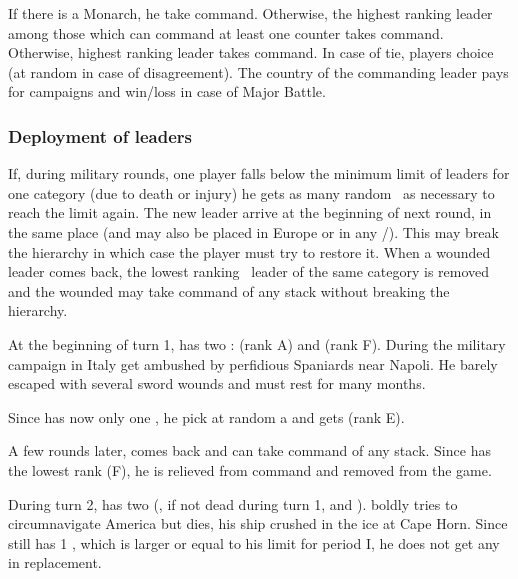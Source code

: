 \aparag[At sea]
\bparag If there is a Monarch, he take command.
\bparag Otherwise, the highest ranking leader among those which can command at
least one \FLEET counter takes command.
\bparag Otherwise, highest ranking leader takes command.
\bparag In case of tie, players choice (at random in case of disagreement).
\bparag The country of the commanding leader pays for campaigns and win/loss
\STAB in case of Major Battle.

\subsubsection{Deployment of leaders}
\label{chMilitary:Leaders:Below limit}
\bparag If, during military rounds, one player falls below the minimum limit
of leaders for one category (due to death or injury) he gets as many random
\anonyme\ as necessary to reach the limit again.
\bparag The new leader arrive at the beginning of next round, in the same
place (\LeaderE and \LeaderC may also be placed in Europe or in any
\COL/\TP).
\bparag This may break the hierarchy in which case the player must try to
restore it.
\bparag When a wounded leader comes back, the lowest ranking \anonyme\ leader
of the same category is removed and the wounded may take command of any stack
without breaking the hierarchy.

\begin{exemple}
  At the beginning of turn 1, \FRA has two \LeaderG :  (rank A)
  and  (rank F). During the military campaign in Italy 
  get ambushed by perfidious Spaniards near Napoli. He barely escaped with
  several sword wounds and must rest for many months.

  Since \FRA has now only one \LeaderG, he pick at random a \anonyme\LeaderG
  and gets  (rank E).

  A few rounds later,  comes back and can take command of any
  stack. Since  has the lowest rank (F), he is relieved from command
  and removed from the game.

  \smallskip

  During turn 2, \POR has two \LeaderE (, if not dead during turn
  1, and ).  boldly tries to circumnavigate
  America but dies, his ship crushed in the ice at Cape Horn. Since \POR still
  has 1 \LeaderE, which is larger or equal to his limit for period I, he does
  not get any \anonyme\LeaderE in replacement.
\end{exemple}

